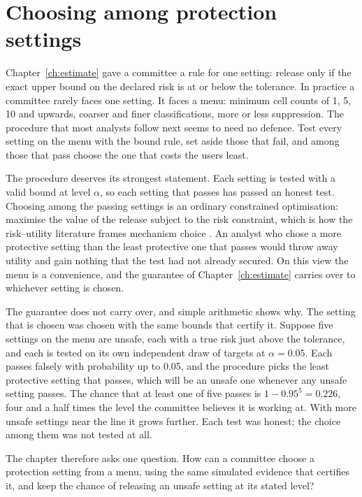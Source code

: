 \chapter{Choosing among protection settings}\label{ch:selection}

Chapter~\ref{ch:estimate} gave a committee a rule for one setting: release only if the
exact upper bound on the declared risk is at or below the tolerance. In practice a
committee rarely faces one setting. It faces a menu: minimum cell counts of 1, 5, 10 and
upwards, coarser and finer classifications, more or less suppression. The procedure that
most analysts follow next seems to need no defence. Test every setting on the menu with
the bound rule, set aside those that fail, and among those that pass choose the one that
costs the users least.

The procedure deserves its strongest statement. Each setting is tested with a valid
bound at level $\alpha$, so each setting that passes has passed an honest test. Choosing
among the passing settings is an ordinary constrained optimisation: maximise the value of
the release subject to the risk constraint, which is how the risk--utility literature
frames mechanism choice \citep{duncan2001}. An analyst who chose a more protective
setting than the least protective one that passes would throw away utility and gain
nothing that the test had not already secured. On this view the menu is a convenience,
and the guarantee of Chapter~\ref{ch:estimate} carries over to whichever setting is
chosen.

The guarantee does not carry over, and simple arithmetic shows why. The setting that is
chosen was chosen with the same bounds that certify it. Suppose five settings on the menu
are unsafe, each with a true risk just above the tolerance, and each is tested on its own
independent draw of targets at $\alpha = 0.05$. Each passes falsely with probability up
to 0.05, and the procedure picks the least protective setting that passes, which will be
an unsafe one whenever any unsafe setting passes. The chance that at least one of five
passes is $1 - 0.95^5 = 0.226$, four and a half times the level the committee believes
it is working at.
With more unsafe settings near the line it grows further. Each test was honest; the
choice among them was not tested at all.

The chapter therefore asks one question. How can a committee choose a protection setting
from a menu, using the same simulated evidence that certifies it, and keep the chance of
releasing an unsafe setting at its stated level?

